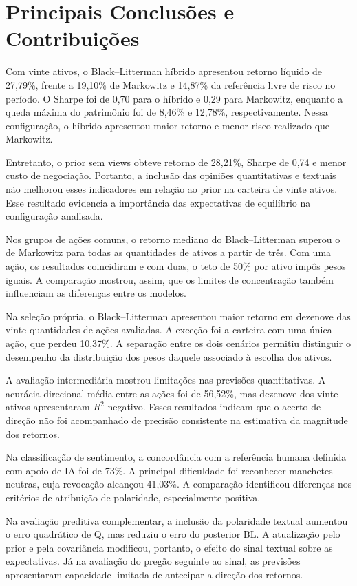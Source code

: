 \section{Principais Conclusões e Contribuições}
\label{sec:conclusao_contribuicoes}

Com vinte ativos, o Black--Litterman híbrido apresentou
retorno líquido de 27,79\%, frente a 19,10\% de Markowitz
e 14,87\% da referência livre de risco no período.
O Sharpe foi de 0,70 para o híbrido e 0,29 para Markowitz,
enquanto a queda máxima do patrimônio foi de 8,46\%
e 12,78\%, respectivamente. Nessa configuração, o híbrido
apresentou maior retorno e menor risco realizado que
Markowitz.

Entretanto, o prior sem views obteve retorno de 28,21\%,
Sharpe de 0,74 e menor custo de negociação. Portanto,
a inclusão das opiniões quantitativas e textuais não
melhorou esses indicadores em relação ao prior na
carteira de vinte ativos. Esse resultado evidencia a
importância das expectativas de equilíbrio na configuração
analisada.

Nos grupos de ações comuns, o retorno mediano do
Black--Litterman superou o de Markowitz para todas as
quantidades de ativos a partir de três. Com uma ação,
os resultados coincidiram e com duas, o teto de 50\%
por ativo impôs pesos iguais. A comparação mostrou,
assim, que os limites de concentração também influenciam
as diferenças entre os modelos.

Na seleção própria, o Black--Litterman apresentou maior
retorno em dezenove das vinte quantidades de ações
avaliadas. A exceção foi a carteira com uma única ação,
que perdeu 10,37\%. A separação entre os dois cenários
permitiu distinguir o desempenho da distribuição dos
pesos daquele associado à escolha dos ativos.

A avaliação intermediária mostrou limitações nas previsões
quantitativas. A acurácia direcional média entre as ações
foi de 56,52\%, mas dezenove dos vinte ativos apresentaram
$R^2$ negativo. Esses resultados indicam que o acerto
de direção não foi acompanhado de precisão consistente
na estimativa da magnitude dos retornos.

Na classificação de sentimento, a concordância com a
referência humana definida com apoio de IA foi de 73\%.
A principal dificuldade foi reconhecer manchetes neutras,
cuja revocação alcançou 41,03\%. A comparação identificou
diferenças nos critérios de atribuição de polaridade,
especialmente positiva.

Na avaliação preditiva complementar, a inclusão da
polaridade textual aumentou o erro quadrático de Q,
mas reduziu o erro do posterior BL. A atualização pelo
prior e pela covariância modificou, portanto, o efeito
do sinal textual sobre as expectativas. Já na avaliação
do pregão seguinte ao sinal, as previsões apresentaram
capacidade limitada de antecipar a direção dos retornos.

